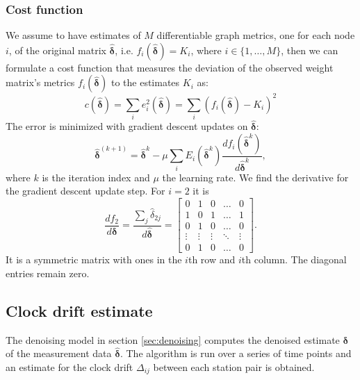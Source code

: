 \documentclass[12pt, sumlimits, intlimits]{article}
\begin{document}
\subsubsection{Cost function}
We assume to have estimates of $M$ differentiable graph metrics, one for each node $i$, of the original matrix $\bm{\hat{\delta}}$, i.e. $f_i(\bm{\hat{\delta}}) = K_i$, where $i\in\{ 1,\dots, M \}$, then we can formulate a cost function that measures the deviation of the observed weight matrix's metrics $f_i(\bm{\hat{\delta}})$ to the estimates $K_i$ as: 
\begin{equation}
c(\bm{\hat{\delta}}) = \sum_i e_i^2(\bm{\hat{\delta}}) = \sum_i(f_i(\bm{\hat{\delta}})-K_i)^2
\end{equation}
The error is minimized with gradient descent updates on $\bm{\hat{\delta}}$: 
\begin{equation}
\bm{\hat{\delta}}^{(k+1)} = \bm{\hat{\delta}}^k-\mu\sum_i E_i(\bm{\hat{\delta}}^k)\frac{df_i(\bm{\hat{\delta}}^k)}{d\bm{\hat{\delta}}^k},
\label{eq:updates}
\end{equation}
where $k$ is the iteration index and $\mu$ the learning rate. %
We find the derivative for the gradient descent update step. For $i=2$ it is
\begin{equation}
\frac{df_2}{d\bm{\delta}}=\frac{\sum_j \hat{\delta}_{2j}}{d\bm{\hat{\delta}}}=
\begin{bmatrix}
0 & 1 & 0 & \dots  & 0 \\
1 & 0 & 1 & \dots  & 1 \\
0 & 1 & 0 & \dots  & 0 \\
\vdots & \vdots & \vdots & \ddots & \vdots \\
0 & 1 & 0 & \dots  & 0
\end{bmatrix}.
\end{equation}
It is a symmetric matrix with ones in the $i$th row and $i$th column. The diagonal entries remain zero.

\subsection{Clock drift estimate}

The denoising model in section \ref{sec:denoising} computes the denoised estimate $\bm{\delta}$ of the measurement data $\bm{\hat{\delta}}$. The algorithm is run over a series of time points and an estimate for the clock drift $\Delta_{ij}$ between each station pair is obtained. 
\end{document}
